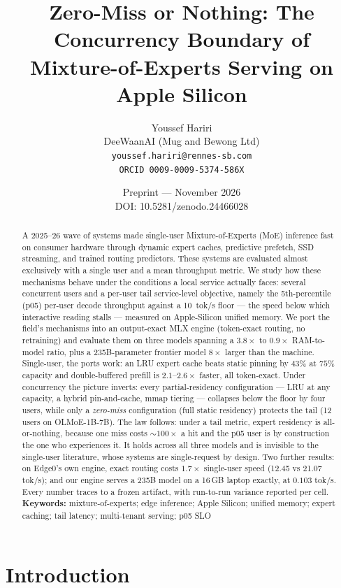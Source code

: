 \documentclass[11pt]{article}
\title{\textbf{Zero-Miss or Nothing: The Concurrency Boundary of\\
Mixture-of-Experts Serving on Apple Silicon}}
\author{Youssef Hariri\\
DeeWaanAI (Mug and Bewong Ltd)\\
\texttt{youssef.hariri@rennes-sb.com}\\
\texttt{ORCID 0009-0009-5374-586X}}
\date{Preprint --- November 2026\\ \small DOI: 10.5281/zenodo.24466028}
\newcommand{\ppl}{\ensuremath{\times}}
\begin{document}
\maketitle

\begin{abstract}
\noindent
A 2025--26 wave of systems made single-user Mixture-of-Experts (MoE)
inference fast on consumer hardware through dynamic expert caches,
predictive prefetch, SSD streaming, and trained routing predictors. These
systems are evaluated almost exclusively with a single user and a mean
throughput metric. We study how these mechanisms behave under the conditions
a local service actually faces: several concurrent users and a per-user tail
service-level objective, namely the 5th-percentile (p05) per-user decode
throughput against a \SI{10}{tok/s} floor --- the speed below which
interactive reading stalls --- measured on Apple-Silicon unified memory. We
port the field's mechanisms into an output-exact MLX engine (token-exact
routing, no retraining) and evaluate them on three models spanning a
$3.8\ppl$ to $0.9\ppl$ RAM-to-model ratio, plus a 235B-parameter frontier
model $8\ppl$ larger than the machine. Single-user, the ports work: an LRU
expert cache beats static pinning by $43\%$ at $75\%$ capacity and
double-buffered prefill is $2.1$--$2.6\ppl$ faster, all token-exact.
Under concurrency the picture inverts: every partial-residency configuration
--- LRU at any capacity, a hybrid pin-and-cache, mmap tiering --- collapses
below the floor by four users, while only a \emph{zero-miss} configuration
(full static residency) protects the tail (12 users on OLMoE-1B-7B). The
law follows: under a tail metric, expert residency is all-or-nothing,
because one miss costs ${\sim}100\ppl$ a hit and the p05 user is by
construction the one who experiences it. It holds across all three models
and is invisible to the single-user literature, whose systems are
single-request by design. Two further results: on Edge0's own engine, exact
routing costs $1.7\ppl$ single-user speed (12.45 vs 21.07 tok/s); and our
engine serves a 235B model on a 16\,GB laptop exactly, at $0.103$ tok/s.
Every number traces to a frozen artifact, with run-to-run variance reported
per cell.
\medskip
\noindent\textbf{Keywords:} mixture-of-experts; edge inference; Apple
Silicon; unified memory; expert caching; tail latency; multi-tenant
serving; p05 SLO
\end{abstract}
\newpage

\section{Introduction}
\end{document}
